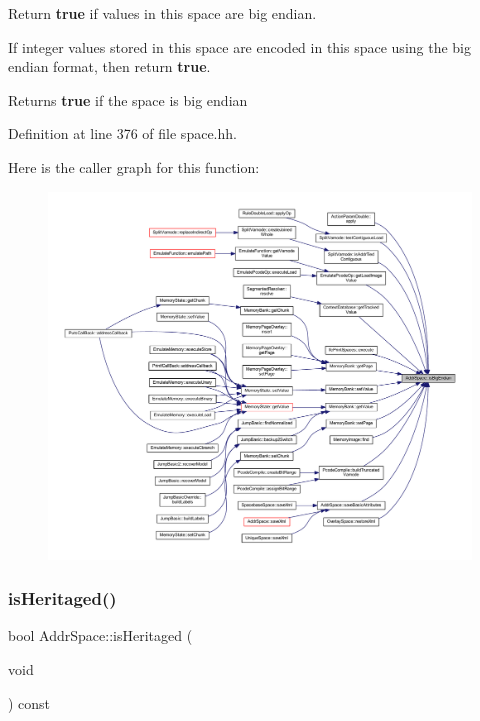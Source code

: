 Return {\bfseries{true}} if values in this space are big endian. 

If integer values stored in this space are encoded in this space using the big endian format, then return {\bfseries{true}}. \begin{DoxyReturn}{Returns}
{\bfseries{true}} if the space is big endian 
\end{DoxyReturn}


Definition at line 376 of file space.\+hh.

Here is the caller graph for this function\+:
\nopagebreak
\begin{figure}[H]
\begin{center}
\leavevmode
\includegraphics[width=350pt]{class_addr_space_af5683c0d7e42edec80b97bcb9fb3dc11_icgraph}
\end{center}
\end{figure}
\mbox{\label{class_addr_space_a807313f845cda34701898ec89bad58cb}} 
\subsubsection{\texorpdfstring{isHeritaged()}{isHeritaged()}}
{\footnotesize\ttfamily bool Addr\+Space\+::is\+Heritaged (\begin{DoxyParamCaption}\item[{void}]{ }\end{DoxyParamCaption}) const\hspace{0.3cm}{\ttfamily [inline]}}




